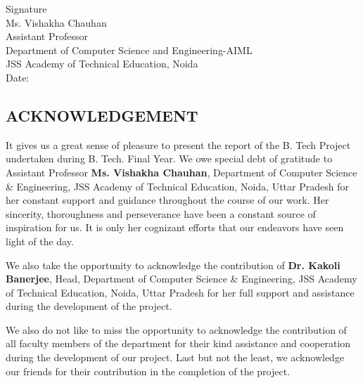 \vspace{15 mm}

\begin{flushleft}

Signature\\
\vspace{10 mm}
Ms. Vishakha Chauhan\\
Assistant Professor\\
Department of Computer Science and Engineering-AIML\\
JSS Academy of Technical Education, Noida\\
\vspace{10mm}
Date:
\end{flushleft}
\restoregeometry
\newpage

\begin{center}
 \chapter*{\size \textbf{ACKNOWLEDGEMENT}}
\end{center}
\newline
It gives us a great sense of pleasure to present the report of the B. Tech Project undertaken during B. Tech. Final Year. We owe special debt of gratitude to Assistant Professor \textbf{Ms. Vishakha Chauhan}, Department of Computer Science \& Engineering, JSS Academy of Technical Education, Noida, Uttar Pradesh for her constant support and guidance throughout the course of our work. Her sincerity, thoroughness and perseverance have been a constant source of inspiration for us. It is only her cognizant efforts that our endeavors have seen light of the day.

We also take the opportunity to acknowledge the contribution of \textbf{Dr. Kakoli Banerjee}, Head, Department of Computer Science \& Engineering, JSS Academy of Technical Education, Noida, Uttar Pradesh for her full support and assistance during the development of the project.

We also do not like to miss the opportunity to acknowledge the contribution of all faculty members of the department for their kind assistance and cooperation during the development of our project. Last but not the least, we acknowledge our friends for their contribution in the completion of the project.

